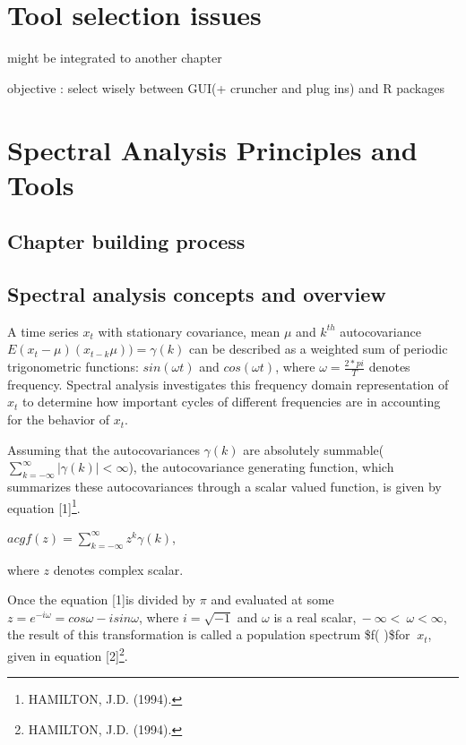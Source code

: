 \documentclass[
  letterpaper,
  DIV=11,
  numbers=noendperiod]{scrreprt}
\begin{document}
\hypertarget{tool-selection-issues}{%
\chapter{Tool selection issues}\label{tool-selection-issues}}

might be integrated to another chapter

objective : select wisely between GUI(+ cruncher and plug ins) and R
packages

\hypertarget{spectral-analysis-principles-and-tools}{%
\chapter{Spectral Analysis Principles and
Tools}\label{spectral-analysis-principles-and-tools}}

\hypertarget{chapter-building-process}{%
\section{Chapter building process}\label{chapter-building-process}}

\hypertarget{spectral-analysis-concepts-and-overview}{%
\section{Spectral analysis concepts and
overview}\label{spectral-analysis-concepts-and-overview}}

A time series \(x_{t}\) with stationary covariance, mean \(μ\) and
\(k^{th}\) autocovariance \(E(x_{t}-\mu)(x_{t- k}\mu))=\gamma(k)\) can
be described as a weighted sum of periodic trigonometric functions:
\(sin(\omega t)\) and \(cos(\omega t)\), where \(\omega=\frac{2*pi}{T}\)
denotes frequency. Spectral analysis investigates this frequency domain
representation of \(x_{t}\) to determine how important cycles of
different frequencies are in accounting for the behavior of \(x_{t}\).

Assuming that the autocovariances \(\gamma(k)\) are absolutely
summable(\(\sum_{k =-\infty}^{\infty}|\gamma(k)|<\infty\)), the
autocovariance generating function, which summarizes these
autocovariances through a scalar valued function, is given by equation
{[}1{]}\footnote{HAMILTON, J.D. (1994).}.

\(acgf(z)=\sum_{k=-\infty}^{\infty}{z^{k}\gamma(k)}\),

where \(z\) denotes complex scalar.

Once the equation {[}1{]}is divided by \(\pi\) and evaluated at some
\(z{= e}^{- i\omega} = cos\omega - isin\omega\), where
\(i = \sqrt{- 1}\) and \(\omega\) is a real
scalar,\(\  - \infty < \ \omega < \infty\), the result of this
transformation is called a population spectrum \$f( \omega )\$for
\(\ x_{t}\), given in equation {[}2{]}\footnote{HAMILTON, J.D. (1994).}.
\end{document}
